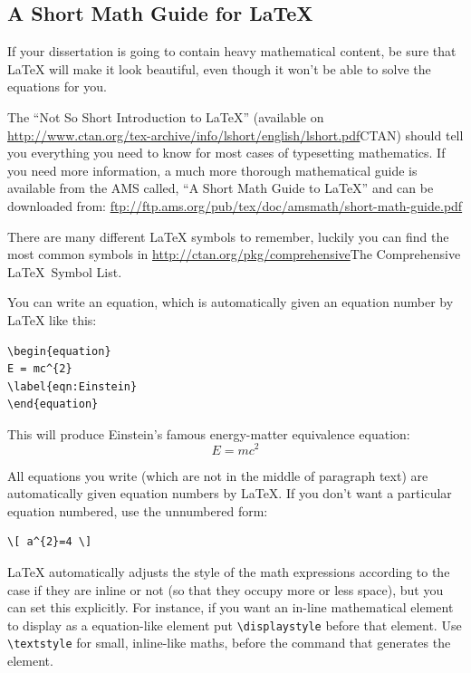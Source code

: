 \subsection{A Short Math Guide for \LaTeX{}}

If your dissertation is going to contain heavy mathematical content, be sure that \LaTeX{} will make it look beautiful, even though it won't be able to solve the equations for you.

The \enquote{Not So Short Introduction to \LaTeX} (available on \url{http://www.ctan.org/tex-archive/info/lshort/english/lshort.pdf}{CTAN}) should tell you everything you need to know for most cases of typesetting mathematics. If you need more information, a much more thorough mathematical guide is available from the AMS called, \enquote{A Short Math Guide to \LaTeX} and can be downloaded from:
\url{ftp://ftp.ams.org/pub/tex/doc/amsmath/short-math-guide.pdf}

There are many different \LaTeX{} symbols to remember, luckily you can find the most common symbols in \url{http://ctan.org/pkg/comprehensive}{The Comprehensive \LaTeX~Symbol List}.

You can write an equation, which is automatically given an equation number by \LaTeX{} like this:
\begin{verbatim}
\begin{equation}
E = mc^{2}
\label{eqn:Einstein}
\end{equation}
\end{verbatim}

This will produce Einstein's famous energy-matter equivalence equation:
\begin{equation}
E = mc^{2}
\label{eqn:Einstein}
\end{equation}

All equations you write (which are not in the middle of paragraph text) are automatically given equation numbers by \LaTeX{}. If you don't want a particular equation numbered, use the unnumbered form:
\begin{verbatim}
\[ a^{2}=4 \]
\end{verbatim}

\LaTeX{} automatically adjusts the style of the math expressions according to the case if they are inline or not (so that they occupy more or less space), but you can set this explicitly. For instance, if you want an in-line mathematical element to display as a equation-like element put \texttt{\textbackslash displaystyle} before that element. Use \texttt{\textbackslash textstyle} for small, inline-like maths, before the command that generates the element.

